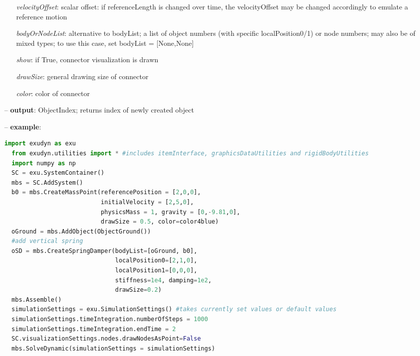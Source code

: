 \begin{itemize}[leftmargin=0.7cm]
\begin{itemize}[leftmargin=1.2cm]
\item[]{\it velocityOffset}: scalar offset: if referenceLength is changed over time, the velocityOffset may be changed accordingly to emulate a reference motion
\item[]{\it bodyOrNodeList}: alternative to bodyList; a list of object numbers (with specific localPosition0/1) or node numbers; may also be of mixed types; to use this case, set bodyList = [None,None]
\item[]{\it show}: if True, connector visualization is drawn
\item[]{\it drawSize}: general drawing size of connector
\item[]{\it color}: color of connector
\end{itemize}
\item[--]
{\bf output}: ObjectIndex; returns index of newly created object
\item[--]
{\bf example}: \vspace{-12pt}\ei\begin{lstlisting}[language=Python, xleftmargin=36pt]
  import exudyn as exu
  from exudyn.utilities import * #includes itemInterface, graphicsDataUtilities and rigidBodyUtilities
  import numpy as np
  SC = exu.SystemContainer()
  mbs = SC.AddSystem()
  b0 = mbs.CreateMassPoint(referencePosition = [2,0,0],
                           initialVelocity = [2,5,0],
                           physicsMass = 1, gravity = [0,-9.81,0],
                           drawSize = 0.5, color=color4blue)
  oGround = mbs.AddObject(ObjectGround())
  #add vertical spring
  oSD = mbs.CreateSpringDamper(bodyList=[oGround, b0],
                               localPosition0=[2,1,0],
                               localPosition1=[0,0,0],
                               stiffness=1e4, damping=1e2,
                               drawSize=0.2)
  mbs.Assemble()
  simulationSettings = exu.SimulationSettings() #takes currently set values or default values
  simulationSettings.timeIntegration.numberOfSteps = 1000
  simulationSettings.timeIntegration.endTime = 2
  SC.visualizationSettings.nodes.drawNodesAsPoint=False
  mbs.SolveDynamic(simulationSettings = simulationSettings)
\end{lstlisting}\vspace{-24pt}\bi\item[]\vspace{-24pt}\vspace{12pt}\end{itemize}
%

